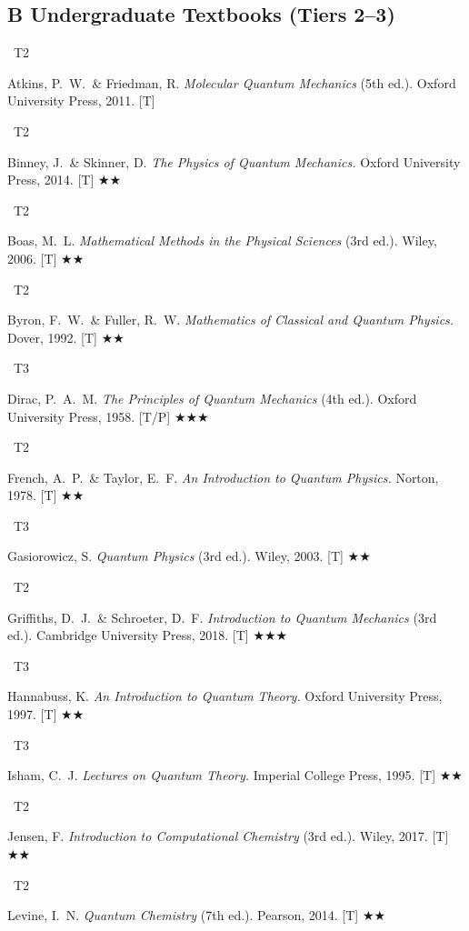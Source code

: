\documentclass[11pt,a4paper]{article}
\newcommand{\tierbadge}[2]{\colorbox{#1}{\small\bfseries\color{white}\strut\ #2\ }}
\newcommand{\essential}{$\bigstar\bigstar\bigstar$}
\newcommand{\recommended}{$\bigstar\bigstar$}
\begin{document}
\subsection*{B \quad Undergraduate Textbooks (Tiers 2--3)}
\begin{tcolorbox}[catbox]
\begin{enumerate}[leftmargin=2.5em,label=\textbf{[B\arabic*]},itemsep=3pt]
  \item \tierbadge{t2blue}{T2} Atkins, P.~W.\ \& Friedman, R. \textit{Molecular Quantum Mechanics} (5th ed.). Oxford University Press, 2011. [T]
  \item \tierbadge{t2blue}{T2} Binney, J.\ \& Skinner, D. \textit{The Physics of Quantum Mechanics.} Oxford University Press, 2014. [T] \recommended
  \item \tierbadge{t2blue}{T2} Boas, M.~L. \textit{Mathematical Methods in the Physical Sciences} (3rd ed.). Wiley, 2006. [T] \recommended
  \item \tierbadge{t2blue}{T2} Byron, F.~W.\ \& Fuller, R.~W. \textit{Mathematics of Classical and Quantum Physics.} Dover, 1992. [T] \recommended
  \item \tierbadge{t3purple}{T3} Dirac, P.~A.~M. \textit{The Principles of Quantum Mechanics} (4th ed.). Oxford University Press, 1958. [T/P] \essential
  \item \tierbadge{t2blue}{T2} French, A.~P.\ \& Taylor, E.~F. \textit{An Introduction to Quantum Physics.} Norton, 1978. [T] \recommended
  \item \tierbadge{t3purple}{T3} Gasiorowicz, S. \textit{Quantum Physics} (3rd ed.). Wiley, 2003. [T] \recommended
  \item \tierbadge{t2blue}{T2} Griffiths, D.~J.\ \& Schroeter, D.~F. \textit{Introduction to Quantum Mechanics} (3rd ed.). Cambridge University Press, 2018. [T] \essential
  \item \tierbadge{t3purple}{T3} Hannabuss, K. \textit{An Introduction to Quantum Theory.} Oxford University Press, 1997. [T] \recommended
  \item \tierbadge{t3purple}{T3} Isham, C.~J. \textit{Lectures on Quantum Theory.} Imperial College Press, 1995. [T] \recommended
  \item \tierbadge{t2blue}{T2} Jensen, F. \textit{Introduction to Computational Chemistry} (3rd ed.). Wiley, 2017. [T] \recommended
  \item \tierbadge{t2blue}{T2} Levine, I.~N. \textit{Quantum Chemistry} (7th ed.). Pearson, 2014. [T] \recommended

\end{enumerate}
\end{tcolorbox}
\end{document}
